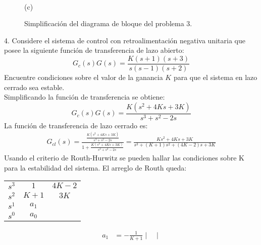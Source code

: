 \documentclass[11pt, spanish]{article}
\begin{document}
\begin{description}
\begin{figure}
\\
				(c)
				\caption{Simplificación del diagrama de bloque del problema 3.}
				\label{fig:blockDiagramSimplification}
			\end{figure}

			\item 4. Considere el sistema de control con retroalimentación negativa unitaria que posee la siguiente función de transferencia de lazo abierto:
			\begin{equation*}
				G_c(s)G(s) = \frac{K(s+1)(s+3)}{s(s-1)(s+2)}
			\end{equation*}
			Encuentre condiciones sobre el valor de la ganancia $K$ para que el sistema en lazo cerrado sea estable.\\
			Simplificando la función de transferencia se obtiene:
			\begin{equation*}
				G_c(s)G(s) = \frac{K(s^2+4Ks+3K)}{s^3+s^2-2s}
			\end{equation*}
			La función de transferencia de lazo cerrado es:
			\begin{align*}
				G_{cl}(s) = \frac{\frac{K(s^2+4Ks+3K)}{s^3+s^2-2s}}{1+\frac{K(s^2+4Ks+3K)}{s^3+s^2-2s}} = \frac{Ks^2+4Ks+3K}{s^3+(K+1)s^2+(4K-2)s+3K}
			\end{align*}
			Usando el criterio de Routh-Hurwitz se pueden hallar las condiciones sobre K para la estabilidad del sistema. El arreglo de Routh queda:
			\begin{table}[h]
				\centering
				\begin{tabular}{c|cc}
					$s^3$ & $1$ & $4K-2$\\
					$s^2$ & $K+1$ & $3K$\\
					$s^1$	& $a_1$\\
					$s^0$ & $a_0$
				\end{tabular}
			\end{table}
			\begin{align*}
				a_1 &= -\frac{1}{K+1}
				\begin{vmatrix}

\end{vmatrix}
\end{align*}
\end{description}
\end{document}
